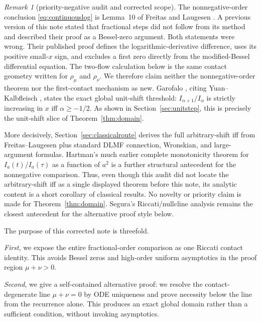 \documentclass[11pt]{article}
\theoremstyle{remark}
\newtheorem{remark}[theorem]{Remark}
\begin{document}
\begin{remark}[priority-negative audit and corrected scope]
\label{rem:scope}
The nonnegative-order conclusion \eqref{eq:continuouslog} is Lemma~10
of Freitas and Laugesen \cite{FreitasLaugesen}.  A previous version of
this note stated that fractional steps did not follow from its method
and described their proof as a Bessel-zero argument.  Both statements
were wrong.  Their published proof defines the logarithmic-derivative
difference, uses its positive small-$x$ sign, and excludes a first zero
directly from the modified-Bessel differential equation.  The
two-flow calculation below is the same contact geometry written for
$\rho_\mu$ and $\rho_\nu$.  We therefore claim neither the
nonnegative-order theorem nor the first-contact mechanism as new.
Garofalo \cite[Prop.~8.8]{Garofalo}, citing Yuan--Kalbfleisch
\cite[Appendix]{YuanKalbfleisch}, states the exact global unit-shift
threshold: $I_{\alpha+1}/I_\alpha$ is strictly increasing in $x$ iff
$\alpha\ge-1/2$.  As shown in Section~\ref{sec:unitstep}, this is
precisely the unit-shift slice of Theorem~\ref{thm:domain}.

More decisively, Section~\ref{sec:classicalroute} derives the full
arbitrary-shift iff from Freitas--Laugesen plus standard DLMF connection,
Wronskian, and large-argument formulas.  Hartman's much earlier complete
monotonicity theorem for $I_a(t)/I_a(\tau)$ as a function of $a^2$
\cite[Thm.~1.0]{Hartman1976} is a further structural antecedent for the
nonnegative comparison.  Thus, even though this audit did not locate the
arbitrary-shift iff as a single displayed theorem before this note, its
analytic content is a short corollary of classical results.  No novelty or
priority claim is made for Theorem~\ref{thm:domain}.  Segura's
Riccati/nullcline analysis \cite{Segura2021} remains the closest antecedent
for the alternative proof style below.
\end{remark}

The purpose of this corrected note is threefold.

\emph{First}, we expose the entire fractional-order comparison as one
Riccati contact identity.  This avoids Bessel zeros and high-order
uniform asymptotics in the proof region $\mu+\nu>0$.

\emph{Second}, we give a self-contained alternative proof: we resolve the
contact-degenerate line $\mu+\nu=0$ by
ODE uniqueness and prove necessity below the line from the recurrence
alone.  This produces an exact global domain rather than a sufficient
condition, without invoking asymptotics.
\end{document}
